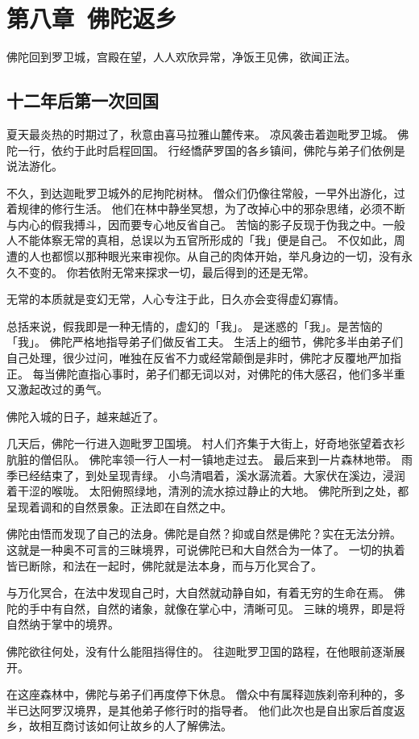 \documentclass[twoside,openany]{book}
\begin{document}
\chapter{第八章\ 佛陀返乡}\label{ch8}
佛陀回到罗卫城，宫殿在望，人人欢欣异常，净饭王见佛，欲闻正法。

\section{十二年后第一次回国}\label{sec8.1}
夏天最炎热的时期过了，秋意由喜马拉雅山麓传来。
凉风袭击着迦毗罗卫城。
佛陀一行，依约于此时启程回国。
行经憍萨罗国的各乡镇间，佛陀与弟子们依例是说法游化。

不久，到达迦毗罗卫城外的尼拘陀树林。
僧众们仍像往常般，一早外出游化，过着规律的修行生活。
他们在林中静坐冥想，为了改掉心中的邪杂思绪，必须不断与内心的假我搏斗，因而要专心地反省自己。
苦恼的影子反现于伪我之中。一般人不能体察无常的真相，总误以为五官所形成的「我」便是自己。
不仅如此，周遭的人也都惯以那种眼光来审视你。从自己的肉体开始，举凡身边的一切，没有永久不变的。
你若依附无常来探求一切，最后得到的还是无常。

无常的本质就是变幻无常，人心专注于此，日久亦会变得虚幻寡情。

总括来说，假我即是一种无情的，虚幻的「我」。
是迷惑的「我」。是苦恼的「我」。
佛陀严格地指导弟子们做反省工夫。
生活上的细节，佛陀多半由弟子们自己处理，很少过问，唯独在反省不力或经常颠倒是非时，佛陀才反覆地严加指正。
每当佛陀直指心事时，弟子们都无词以对，对佛陀的伟大感召，他们多半重又激起改过的勇气。

佛陀入城的日子，越来越近了。

几天后，佛陀一行进入迦毗罗卫国境。
村人们齐集于大街上，好奇地张望着衣衫肮脏的僧侣队。
佛陀率领一行人一村一镇地走过去。
最后来到一片森林地带。
雨季已经结束了，到处呈现青绿。
小鸟清唱着，溪水潺流着。大家伏在溪边，浸润着干涩的喉咙。
太阳俯照绿地，清洌的流水掠过静止的大地。
佛陀所到之处，都呈现着调和的自然景象。正法即在自然之中。

佛陀由悟而发现了自己的法身。佛陀是自然？抑或自然是佛陀？实在无法分辨。
这就是一种奥不可言的三昧境界，可说佛陀已和大自然合为一体了。
一切的执着皆已断除，和法在一起时，佛陀就是法本身，而与万化冥合了。

与万化冥合，在法中发现自己时，大自然就动静自如，有着无穷的生命在焉。
佛陀的手中有自然，自然的诸象，就像在掌心中，清晰可见。
三昧的境界，即是将自然纳于掌中的境界。

佛陀欲往何处，没有什么能阻挡得住的。
往迦毗罗卫国的路程，在他眼前逐渐展开。

在这座森林中，佛陀与弟子们再度停下休息。
僧众中有属释迦族刹帝利种的，多半已达阿罗汉境界，是其他弟子修行时的指导者。
他们此次也是自出家后首度返乡，故相互商讨该如何让故乡的人了解佛法。
\end{document}
